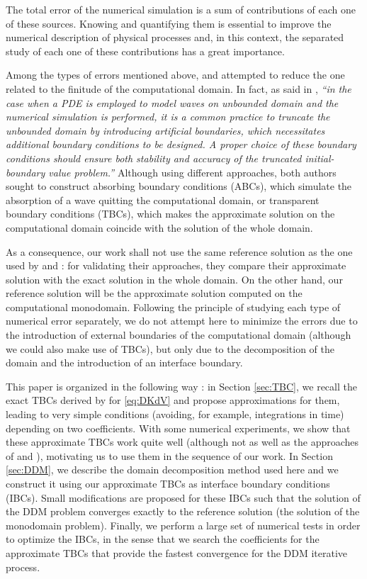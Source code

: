 \indent The total error of the numerical simulation is a sum of contributions of each one of these sources. Knowing and quantifying them is essential to improve the numerical description of physical processes and, in this context, the separated study of each one of these contributions has a great importance.

\indent Among the types of errors mentioned above, \cite{zheng2008} and \cite{besse2015} attempted to reduce the one related to the finitude of the computational domain. In fact, as said in \cite{zheng2008}, \emph{``in the case when a PDE is employed to model waves on unbounded domain and the numerical simulation is performed, it is a common practice to truncate the unbounded domain by introducing artificial boundaries, which necessitates additional boundary conditions to be designed. A proper choice of these boundary conditions should ensure both stability and accuracy of the truncated initial-boundary value problem.''} Although using different approaches, both authors sought to construct absorbing boundary conditions (ABCs), which simulate the absorption of a wave quitting the computational domain, or transparent boundary conditions (TBCs), which makes the approximate solution on the computational domain coincide with the solution of the whole domain.

\indent As a consequence, our work shall not use the same reference solution as the one used by \cite{zheng2008} and \cite{besse2015} : for validating their approaches,  they compare their approximate solution with the exact solution in the whole domain. On the other hand, our reference solution will be the approximate solution computed on the computational monodomain. Following the principle of studying each type of numerical error separately, we do not attempt here to minimize the errors due to the introduction of external boundaries of the computational domain (although we could also make use of TBCs), but only due to the decomposition of the domain and the introduction of an interface boundary.

\indent This paper is organized in the following way : in Section \ref{sec:TBC}, we recall the exact TBCs derived by \cite{zheng2008} for \eqref{eq:DKdV} and propose approximations for them, leading to very simple conditions (avoiding, for example, integrations in time) depending on two coefficients. With some numerical experiments, we show that these approximate TBCs work quite well (although not as well as the approaches of \cite{zheng2008} and \cite{besse2015}), motivating us to use them in the sequence of our work. In Section \ref{sec:DDM}, we describe the domain decomposition method used here and we construct it using our approximate TBCs as interface boundary conditions (IBCs). Small modifications are proposed for these IBCs such that the solution of the DDM problem converges exactly to the reference solution (the solution of the monodomain problem). Finally, we perform a large set of numerical tests in order to optimize the IBCs, in the sense that we search the coefficients for the approximate TBCs that provide the fastest convergence for the DDM iterative process.